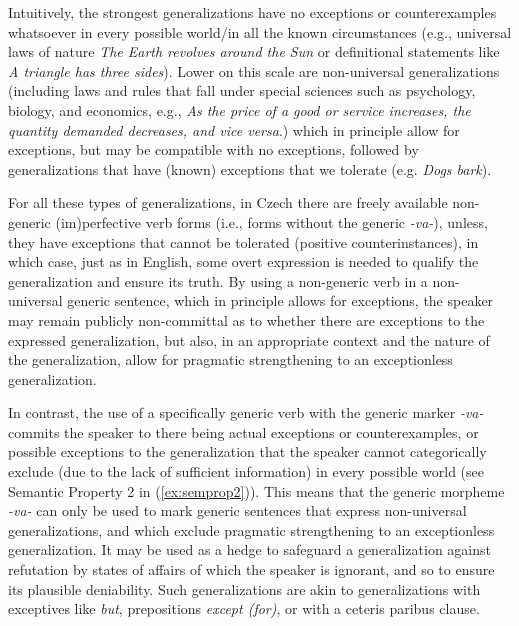 \documentclass[output=paper,colorlinks,citecolor=brown]{langscibook}
\begin{document}
Intuitively, the strongest generalizations have no exceptions or counterexamples whatsoever in every possible world/in all the known circumstances (e.g.,
universal laws of nature
\textit{The Earth revolves around the Sun} or definitional statements like \textit{A triangle has three sides}).
Lower on this scale are
non-universal generalizations (including laws and rules
that fall under special sciences such as
psychology, biology, and economics, e.g., \textit{As the price of a good or service increases, the quantity demanded decreases, and vice versa}.)
which in principle allow for exceptions, but may be compatible with no exceptions, followed by generalizations that have (known) exceptions that we tolerate (e.g. \textit{Dogs bark}).

For all these types of generalizations, in Czech there are
freely available non-generic (im)perfective verb forms (i.e., forms without
the generic \textit{-va-}), unless, they have exceptions that cannot be tolerated
(positive counterinstances), in which case, just as in English, some overt expression  is needed to qualify the generalization and ensure its truth.
By using a non-generic verb in a non-universal generic sentence, which in principle allows for exceptions, the speaker may remain publicly
non-committal as to whether there are exceptions to the expressed generalization, but also, in an appropriate context and the nature of the generalization,
allow for pragmatic strengthening to an exceptionless generalization.


In contrast, the use of a specifically generic verb with the generic marker \textit{-va-} commits the speaker to there being actual exceptions or counterexamples, or possible exceptions to the generalization
that the speaker cannot categorically exclude (due to the lack of sufficient information) in every possible world (see Semantic Property 2 in (\ref{ex:semprop2})). This means that the
generic morpheme \textit{-va-} can only be used to mark
generic sentences
that express non-universal generalizations, and
which exclude pragmatic strengthening to an exceptionless generalization.
It may be used as a hedge to safeguard a generalization against refutation by states of affairs  of which the speaker is ignorant, and so to ensure its plausible deniability.
Such generalizations are akin
to generalizations with exceptives like \textit{but}, prepositions \textit{except (for)},
or with a ceteris paribus clause.
\end{document}

